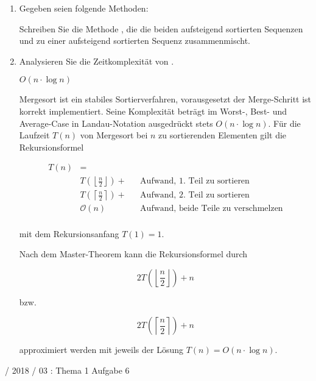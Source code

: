 \documentclass{lehramt-informatik-haupt}
\begin{document}
\begin{enumerate}


\item Gegeben seien folgende Methoden:


Schreiben Sie die Methode ,
die die beiden aufsteigend sortierten Sequenzen  und  zu
einer aufsteigend sortierten Sequenz zusammenmischt.

\begin{antwort}
\end{antwort}


\item Analysieren Sie die Zeitkomplexität von .

\begin{antwort}
$O(n \cdot \log n)$


Mergesort ist ein stabiles Sortierverfahren, vorausgesetzt der
Merge-Schritt ist korrekt implementiert. Seine Komplexität beträgt im
Worst-, Best- und Average-Case in Landau-Notation ausgedrückt stets $O(n
\cdot \log n)$. Für die Laufzeit $T(n)$ von Mergesort bei $n$ zu
sortierenden Elementen gilt die Rekursionsformel

\begin{align*}
T(n) & = \\
     & T\left(\left\lfloor\frac{n}{2}\right\rfloor\right) + && \text{Aufwand, 1. Teil zu sortieren}\\
     & T\left(\left\lceil\frac{n}{2}\right\rceil\right) + && \text{Aufwand, 2. Teil zu sortieren}\\
     & \mathcal{O}(n) && \text{Aufwand, beide Teile zu verschmelzen}\\
\end{align*}

mit dem Rekursionsanfang $T(1) = 1$.

Nach dem Master-Theorem kann die Rekursionsformel durch

\begin{displaymath}
2T\left(\left\lfloor\frac{n}{2}\right\rfloor\right) + n
\end{displaymath}

bzw.

\begin{displaymath}
2T\left(\left\lceil\frac{n}{2}\right\rceil\right) + n
\end{displaymath}

approximiert werden mit jeweils der Lösung $T(n) = O(n \cdot \log n)$.
\end{antwort}

\end{enumerate}

%

 / 2018 / 03 : Thema 1 Aufgabe 6

\literatur
\end{document}
